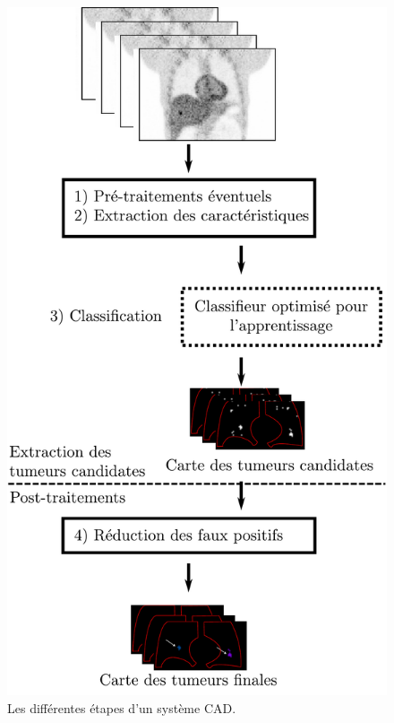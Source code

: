 \begin{figure}[h]
	\begin{center}
	\includegraphics[width=12cm]{images/principeCAD}
	\end{center}
	\caption{Les différentes étapes d'un système CAD.}
	\label{fig:presSystemesCAD}
\end{figure}


